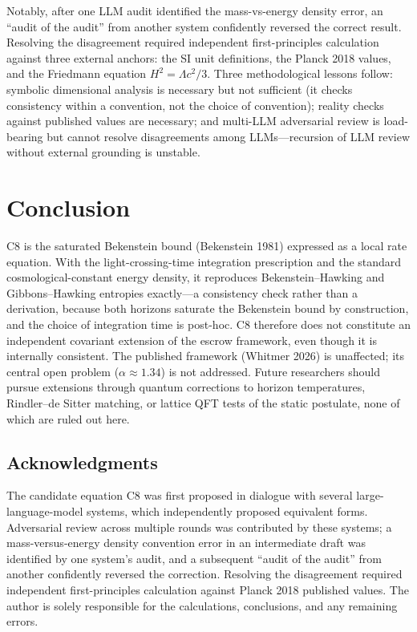 \documentclass[11pt]{article}
\begin{document}
Notably, after one LLM audit identified the mass-vs-energy density error, an ``audit of the audit''
from another system confidently reversed the correct result. Resolving the disagreement required
independent first-principles calculation against three external anchors: the SI unit definitions, the
Planck 2018 values, and the Friedmann equation $H^{2} = \Lambda c^{2}/3$. Three methodological lessons
follow: symbolic dimensional analysis is necessary but not sufficient (it checks consistency within a
convention, not the choice of convention); reality checks against published values are necessary; and
multi-LLM adversarial review is load-bearing but cannot resolve disagreements among LLMs---recursion of
LLM review without external grounding is unstable.

\section{Conclusion}

C8 is the saturated Bekenstein bound (Bekenstein 1981) expressed as a local rate equation. With the
light-crossing-time integration prescription and the standard cosmological-constant energy density, it
reproduces Bekenstein--Hawking and Gibbons--Hawking entropies exactly---a consistency check rather than
a derivation, because both horizons saturate the Bekenstein bound by construction, and the choice of
integration time is post-hoc. C8 therefore does not constitute an independent covariant extension of
the escrow framework, even though it is internally consistent. The published framework (Whitmer 2026)
is unaffected; its central open problem ($\alpha \approx 1.34$) is not addressed. Future researchers
should pursue extensions through quantum corrections to horizon temperatures, Rindler--de Sitter
matching, or lattice QFT tests of the static postulate, none of which are ruled out here.

\subsection*{Acknowledgments}
The candidate equation C8 was first proposed in dialogue with several large-language-model systems, which independently proposed equivalent forms. Adversarial review across multiple rounds was contributed by these systems; a mass-versus-energy density convention error in an intermediate draft was identified by one system's audit, and a subsequent ``audit of the audit'' from another confidently reversed the correction. Resolving the disagreement required independent first-principles calculation against Planck 2018 published values. The author is solely responsible for the calculations, conclusions, and any remaining errors.
\end{document}
